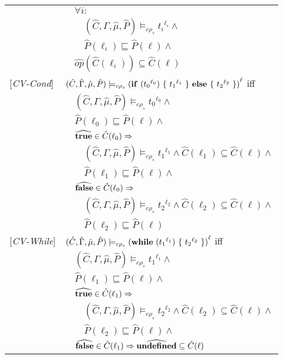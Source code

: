 \documentclass[[12pt,a4paper,twoside,openrigh]{article}
\newcommand{\Cat}[0]{\hat{C}}
\newcommand{\muat}[0]{\hat{\mu}}
\newcommand{\Env}[0]{\hat{\Gamma}}
\newcommand{\Pat}[0]{\hat{P}}
\newcommand{\cenvs}{(\Cat,\Env,\muat,\Pat)}
\newcommand{\ccest}[1]{\cenvs \models_{c \rho_s} #1}
\newcommand{\ccestl}[1]{\cenvs \models_{c \rho_s} {(#1)}^{\ell}}
\newcommand{\lbt}[1]{{t_#1}^{\ell_#1}}
\begin{document}
\begin{tabular}{l l l l}
&&\multicolumn{2}{l}{$\forall i :$}\\
&&&$\ccest {\lbt i} \wedge $\\
&&&$\Pat(\ell_i) \sqsubseteq \Pat(\ell) \wedge$\\
&&\multicolumn{2}{l}{$\widehat{op} (\Cat(\ell_i)) \subseteq \Cat(\ell) $}\\
{[\textit{CV-Cond}]}&\multicolumn{3}{l}{$\ccestl{\cond {\lbt 0} {\lbt 1} {\lbt 2}} $ iff}\\
&&\multicolumn{2}{l}{$ \ccest {\lbt 0} \wedge $}\\
&&\multicolumn{2}{l}{$\Pat(\ell_0) \sqsubseteq \Pat(\ell) \wedge$} \\
&&\multicolumn{2}{l}{$\widehat{\true} \in \Cat(\ell_0) \Rightarrow$}\\
&&&$\ccest {\lbt 1} \wedge \Cat(\ell_1) \subseteq \Cat(\ell)\wedge$\\
&&&$\Pat(\ell_1) \sqsubseteq \Pat(\ell) \wedge$ \\
&&\multicolumn{2}{l}{$\widehat{\false} \in \Cat(\ell_0) \Rightarrow$}\\
&&&$\ccest {\lbt 2} \wedge \Cat(\ell_2) \subseteq \Cat(\ell) \wedge$\\
&&&$\Pat(\ell_2) \sqsubseteq \Pat(\ell)$ \\
{[\textit{CV-While}]}&\multicolumn{3}{l}{$\ccestl {\while {\lbt 1} {\lbt 2}} $ iff}\\
&&\multicolumn{2}{l}{$ \ccest {\lbt 1} \wedge $}\\
&&\multicolumn{2}{l}{$\Pat(\ell_1) \sqsubseteq \Pat(\ell) \wedge$} \\
&&\multicolumn{2}{l}{$\widehat{\true} \in \Cat(\ell_1) \Rightarrow$}\\
&&&$\ccest {\lbt 2} \wedge \Cat(\ell_2) \subseteq \Cat(\ell) \wedge$\\
&&&$ \Pat(\ell_2) \sqsubseteq \Pat(\ell) \wedge$\\
&&\multicolumn{2}{l}{$\widehat{\false} \in \Cat(\ell_1) \Rightarrow \widehat{\undef} \subseteq \Cat(\ell)$}\\
\end{tabular}
\end{document}
